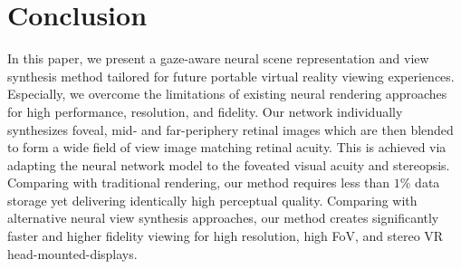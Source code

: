 \section{Conclusion}
\label{sec:conclusion}
In this paper, we present a gaze-aware neural scene representation and view synthesis method tailored for future portable virtual reality viewing experiences. Especially, we overcome the limitations of existing neural rendering approaches for high performance, resolution, and fidelity. Our network individually synthesizes foveal, mid- and far-periphery retinal images which are then blended to form a wide field of view image matching retinal acuity. This is achieved via adapting the neural network model to the foveated visual acuity and stereopsis. 
Comparing with traditional rendering, our method requires less than $1\%$ data storage yet delivering identically high perceptual quality.
Comparing with alternative neural view synthesis approaches, our method creates significantly faster and higher fidelity viewing for high resolution, high FoV, and stereo VR head-mounted-displays.
 

